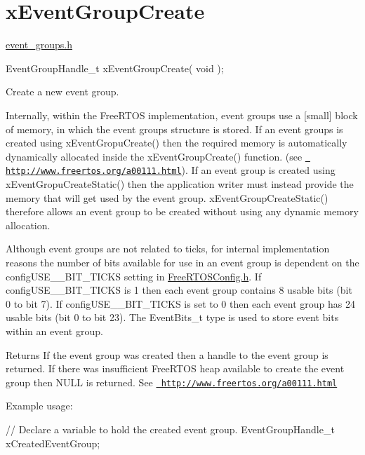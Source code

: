 \hypertarget{group__x_event_group_create}{}\section{x\+Event\+Group\+Create}
\label{group__x_event_group_create}
\mbox{\hyperlink{event__groups_8h_source}{event\+\_\+groups.\+h}} 
\begin{DoxyPre}
EventGroupHandle\_t xEventGroupCreate( void );
\end{DoxyPre}


Create a new event group.

Internally, within the Free\+R\+T\+OS implementation, event groups use a \mbox{[}small\mbox{]} block of memory, in which the event group\textquotesingle{}s structure is stored. If an event groups is created using x\+Event\+Gropu\+Create() then the required memory is automatically dynamically allocated inside the x\+Event\+Group\+Create() function. (see \href{http://www.freertos.org/a00111.html}{\texttt{ http\+://www.\+freertos.\+org/a00111.\+html}}). If an event group is created using x\+Event\+Gropu\+Create\+Static() then the application writer must instead provide the memory that will get used by the event group. x\+Event\+Group\+Create\+Static() therefore allows an event group to be created without using any dynamic memory allocation.

Although event groups are not related to ticks, for internal implementation reasons the number of bits available for use in an event group is dependent on the config\+U\+S\+E\+\_\+\_\+\+B\+I\+T\+\_\+\+T\+I\+C\+KS setting in \mbox{\hyperlink{_free_r_t_o_s_config_8h_source}{Free\+R\+T\+O\+S\+Config.\+h}}. If config\+U\+S\+E\+\_\+\_\+\+B\+I\+T\+\_\+\+T\+I\+C\+KS is 1 then each event group contains 8 usable bits (bit 0 to bit 7). If config\+U\+S\+E\+\_\+\_\+\+B\+I\+T\+\_\+\+T\+I\+C\+KS is set to 0 then each event group has 24 usable bits (bit 0 to bit 23). The Event\+Bits\+\_\+t type is used to store event bits within an event group.

\begin{DoxyReturn}{Returns}
If the event group was created then a handle to the event group is returned. If there was insufficient Free\+R\+T\+OS heap available to create the event group then N\+U\+LL is returned. See \href{http://www.freertos.org/a00111.html}{\texttt{ http\+://www.\+freertos.\+org/a00111.\+html}}
\end{DoxyReturn}
Example usage\+: 
\begin{DoxyPre}
   // Declare a variable to hold the created event group.
   EventGroupHandle\_t xCreatedEventGroup;\end{DoxyPre}



